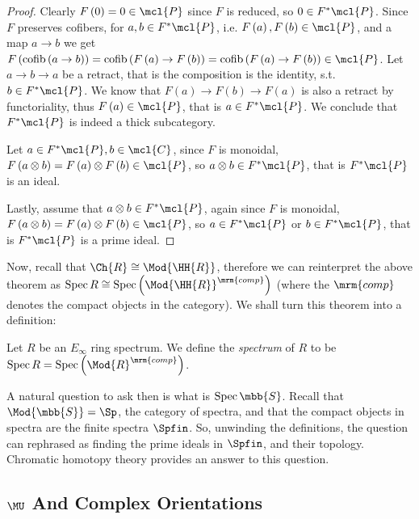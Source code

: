 \begin{proof}
	Clearly $F\left(0\right) = 0 \in \mcl{P}$ since $F$ is reduced, so $0 \in F^*\mcl{P}$.
	Since $F$ preserves cofibers, for $a,b \in F^*\mcl{P}$, i.e. $F\left(a\right), F\left(b\right) \in \mcl{P}$, and a map $a \to b$ we get
	$
	F\left(\cofib\left(a \to b\right)\right)
	= \cofib\left(F\left(a\right) \to F\left(b\right)\right)
	= \cofib\left(F\left(a\right) \to F\left(b\right)\right)
	\in \mcl{P}
	$.
	Let $a \to b \to a$ be a retract, that is the composition is the identity, s.t. $b \in F^*\mcl{P}$. We know that $F\left(a\right) \to F\left(b\right) \to F\left(a\right)$ is also a retract by functoriality, thus $F\left(a\right) \in \mcl{P}$, that is $a \in F^*\mcl{P}$.
	We conclude that $F^*\mcl{P}$ is indeed a thick subcategory.
	
	Let $a \in F^*\mcl{P}, b \in \mcl{C}$, since $F$ is monoidal, $F\left(a \otimes b\right) = F\left(a\right) \otimes F\left(b\right) \in \mcl{P}$, so $a \otimes b \in F^*\mcl{P}$, that is $F^*\mcl{P}$ is an ideal.
	
	Lastly, assume that $a \otimes b \in F^*\mcl{P}$, again since $F$ is monoidal, $F\left(a \otimes b\right) = F\left(a\right) \otimes F\left(b\right) \in \mcl{P}$, so $a \in F^*\mcl{P}$ or $b \in F^*\mcl{P}$, that is $F^*\mcl{P}$ is a prime ideal.
\end{proof}

Now, recall that $\Ch{R} \cong \Mod{\HH{R}}$, therefore we can reinterpret the above theorem as $\spec{R} \cong \spec\left( \Mod{\HH{R}}^\mrm{comp} \right)$ (where the $\mrm{comp}$ denotes the compact objects in the category).
We shall turn this theorem into a definition:

\begin{definition}
	Let $R$ be an $E_\infty$ ring spectrum.
	We define the \emph{spectrum} of $R$ to be
	$\spec{R} = \spec\left( \Mod{R}^\mrm{comp} \right)$.
\end{definition}

A natural question to ask then is what is $\spec{\mbb{S}}$.
Recall that $\Mod{\mbb{S}} = \Sp$, the category of spectra, and that the compact objects in spectra are the finite spectra $\Spfin$.
So, unwinding the definitions, the question can rephrased as finding the prime ideals in $\Spfin$, and their topology.
Chromatic homotopy theory provides an answer to this question.



\subsection{$\MU$ And Complex Orientations}

